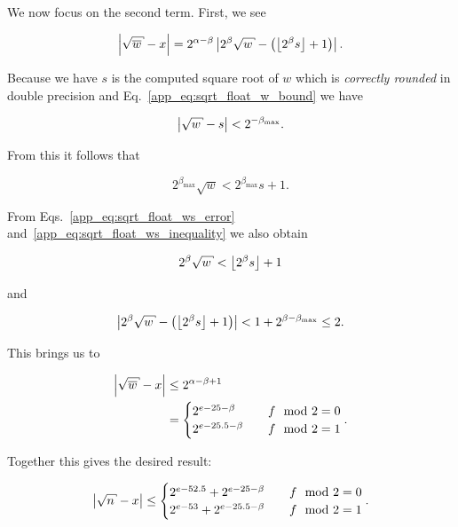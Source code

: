 We now focus on the second term.
First, we see

\begin{equation}
    \abs{\sqrt{\overline{w}} - x}
        = 2^{\alpha-\beta}\abs{2^{\beta}\sqrt{w}-\parens{\floor{2^{\beta}s}+1}}.
\end{equation}

\noindent
Because we have $s$ is the computed square root of $w$
which is \emph{correctly rounded} in double precision
and Eq.~\eqref{app_eq:sqrt_float_w_bound} we have

\begin{equation}
    \abs{\sqrt{w} - s} < 2^{-\beta_{\max}}.
    \label{app_eq:sqrt_float_ws_error}
\end{equation}

\noindent
From this it follows that

\begin{equation}
    2^{\beta_{\max}}\sqrt{w} < 2^{\beta_{\max}}s + 1.
    \label{app_eq:sqrt_float_ws_inequality}
\end{equation}

\noindent
From Eqs.~\eqref{app_eq:sqrt_float_ws_error}
and~\eqref{app_eq:sqrt_float_ws_inequality}
we also obtain

\begin{equation}
    2^{\beta}\sqrt{w} < \floor{2^{\beta}s} + 1
\end{equation}

\noindent
and

\begin{equation}
    \abs{2^{\beta}\sqrt{w}-\parens{\floor{2^{\beta}s}+1}}
        < 1 + 2^{\beta-\beta_{\max}} \le 2.
\end{equation}

\noindent
This brings us to

\begin{align}
    \abs{\sqrt{\overline{w}} - x}
        &\le 2^{\alpha-\beta+1} \nonumber\\
        &= \begin{cases}
            2^{e-25-\beta} &\quad f \mod 2 = 0 \\
            2^{e-25.5-\beta} &\quad f \mod 2 = 1 \\
        \end{cases}.
\end{align}

Together this gives the desired result:

\begin{equation}
    \abs{\sqrt{n} - x} \le \begin{cases}
        2^{e-52.5} + 2^{e-25-\beta}   &\quad f \mod 2 = 0 \\
        2^{e-53}   + 2^{e-25.5-\beta} &\quad f \mod 2 = 1 \\
    \end{cases}.
\end{equation}


